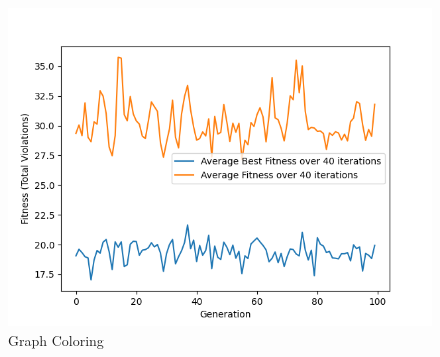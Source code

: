 \documentclass[11pt, letterpaper]{article}
\begin{document}
\begin{figure}[H]
  \includegraphics[width=\linewidth]{images/graphcoloring_rd_fp.png}
  \caption{Graph Coloring}
\endminipage
\end{figure}
\end{document}
